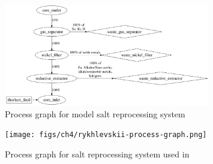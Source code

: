 \begin{figure}[htpb]
    \centering
    \includegraphics[width=0.8\textwidth]{figs/ch4/process_graph.png}
    \caption{Process graph for model salt reprocessing system}
    \label{fig:process-graph}
\end{figure}

\begin{figure}[htpb]
    \centering
    \texttt{[image: figs/ch4/rykhlevskii-process-graph.png]}
    \caption{Process graph for salt reprocessing system used in \cite{rykhlevskii_fuel_2020}}
    \label{fig:rykhlevskii-process-graph}
\end{figure}

